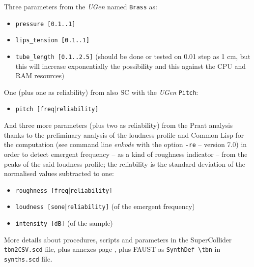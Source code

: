 \documentclass{article}
\begin{document}
\smallskip

Three parameters from the \textit{UGen} named \texttt{Brass} as:
\begin{itemize}
\item \texttt{pressure [0.1..1]}
\item \texttt{lips\_tension [0.1..1]}
\item \texttt{tube\_length [0.1..2.5]} (should be done or tested on 0.01 step as 1 cm, but this will increase exponentially the possibility and this against the CPU and RAM resources)
\end{itemize}

One (plus one as reliability) from also SC with the \textit{UGen} \texttt{Pitch}:
\begin{itemize}
\item \texttt{pitch [freq$|$reliability]}
\end{itemize}

And three more parameters (plus two as reliability) from the Praat analysis thanks to the preliminary analysis of the loudness profile and Common Lisp for the computation (see command line \textsl{enkode} with the option \texttt{-re} --  version 7.0) in order to detect emergent frequency -- as a kind of roughness indicator -- from the peaks of the said loudness profile; the reliability is the standard deviation of the normalised values subtracted to one:
\begin{itemize}
\item \texttt{roughness [freq$|$reliability]} 
\item \texttt{loudness [sone$|$reliability]} (of the emergent frequency)
\item \texttt{intensity [dB]} (of the sample)
\end{itemize}

\smallskip

More details about procedures, scripts and parameters in the SuperCollider  \texttt{tbn2CSV.scd} file, plus annexes page \pageref{annexes}, plus FAUST as \texttt{SynthDef \textbackslash tbn} in \texttt{synths.scd} file.

\smallskip
\end{document}
